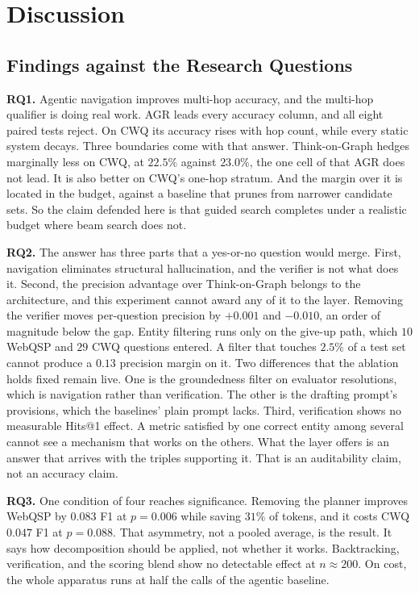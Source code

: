 %
\section{Discussion}\label{sec:discussion}

\subsection{Findings against the Research Questions}

\textbf{RQ1.} Agentic navigation improves multi-hop accuracy, and the multi-hop
qualifier is doing real work. AGR leads every accuracy column, and all eight
paired tests reject. On CWQ its accuracy rises with hop count, while every
static system decays. Three boundaries come with that answer. Think-on-Graph
hedges marginally less on CWQ, at $22.5\%$ against $23.0\%$, the one cell of
 that AGR does not lead. It is also better on CWQ's one-hop
stratum. And the margin over it is located in the budget, against a baseline
that prunes from narrower candidate sets. So the claim defended here is that
guided search completes under a realistic budget where beam search does not.

\textbf{RQ2.} The answer has three parts that a yes-or-no question would merge.
First, navigation eliminates structural hallucination, and the verifier is not
what does it. Second, the precision advantage over Think-on-Graph belongs to the
architecture, and this experiment cannot award any of it to the layer. Removing
the verifier moves per-question precision by $+0.001$ and $-0.010$, an order of
magnitude below the gap. Entity filtering runs only on the give-up path, which
$10$ WebQSP and $29$ CWQ questions entered. A filter that touches $2.5\%$ of a
test set cannot produce a $0.13$ precision margin on it. Two differences that
the ablation holds fixed remain live. One is the groundedness filter on
evaluator resolutions, which is navigation rather than verification. The other
is the drafting prompt's provisions, which the baselines' plain prompt lacks.
Third, verification shows no measurable Hits@1 effect. A metric satisfied by one
correct entity among several cannot see a mechanism that works on the others.
What the layer offers is an answer that arrives with the triples supporting it.
That is an auditability claim, not an accuracy claim.

\textbf{RQ3.} One condition of four reaches significance. Removing the planner
improves WebQSP by $0.083$ F1 at $p = 0.006$ while saving $31\%$ of tokens, and
it costs CWQ $0.047$ F1 at $p = 0.088$. That asymmetry, not a pooled average, is
the result. It says how decomposition should be applied, not whether it works.
Backtracking, verification, and the scoring blend show no detectable effect at
$n \approx 200$. On cost, the whole apparatus runs at half the calls of the
agentic baseline.

